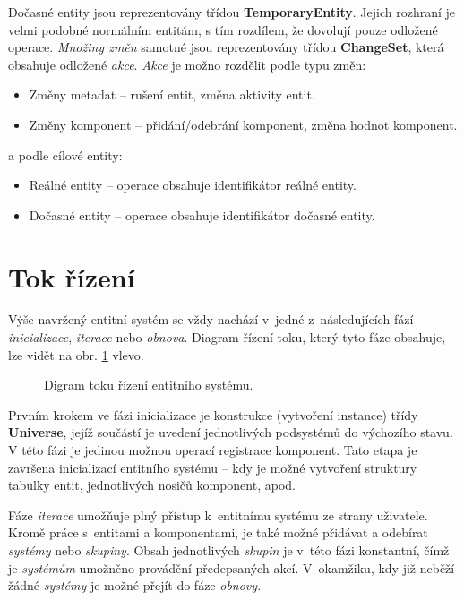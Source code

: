 Dočasné entity jsou reprezentovány třídou \textbf{TemporaryEntity}. Jejich rozhraní je velmi podobné normálním entitám, s tím rozdílem, že dovolují pouze odložené operace. \emph{Množiny změn} samotné jsou reprezentovány třídou \textbf{ChangeSet}, která obsahuje odložené \emph{akce}. \emph{Akce} je možno rozdělit podle typu změn:
\begin{itemize}
	\item Změny metadat -- rušení entit, změna aktivity entit.
	\item Změny komponent -- přidání/odebrání komponent, změna hodnot komponent.
\end{itemize}
\noindent a podle cílové entity: 
\begin{itemize}
	\item Reálné entity -- operace obsahuje identifikátor reálné entity.
	\item Dočasné entity -- operace obsahuje identifikátor dočasné entity.
\end{itemize}

\section{Tok řízení}

Výše navržený entitní systém se vždy nachází v~jedné z~následujících fází -- \emph{inicializace}, \emph{iterace} nebo \emph{obnova}. Diagram řízení toku, který tyto fáze obsahuje, lze vidět na obr. \ref{Fig:DESFlow} vlevo.

\begin{figure}[H]
	\begin{center}
	\end{center}
	\caption{Digram toku řízení entitního systému.}
	\label{Fig:DESFlow}
\end{figure}

Prvním krokem ve fázi inicializace je konstrukce (vytvoření instance) třídy \textbf{Universe}, jejíž součástí je uvedení jednotlivých podsystémů do výchozího stavu. V této fázi je jedinou možnou operací registrace komponent. Tato etapa je završena inicializací entitního systému -- kdy je možné vytvoření struktury tabulky entit, jednotlivých nosičů komponent, apod.

Fáze \emph{iterace} umožňuje plný přístup k~entitnímu systému ze strany uživatele. Kromě práce s~entitami a komponentami, je také možné přidávat a odebírat \emph{systémy} nebo \emph{skupiny}. Obsah jednotlivých \emph{skupin} je v~této fázi konstantní, čímž je \emph{systémům} umožněno provádění předepsaných akcí. V~okamžiku, kdy již neběží žádné \emph{systémy} je možné přejít do fáze \emph{obnovy}.

